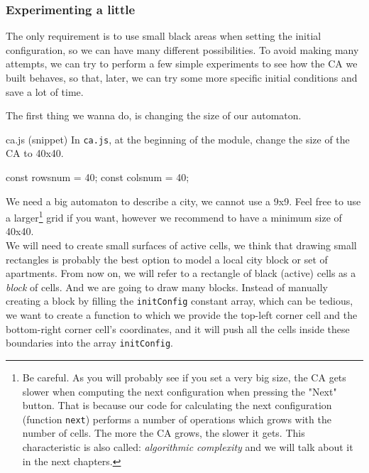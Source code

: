 \subsubsection{Experimenting a little}
The only requirement is to use small black areas when setting the initial configuration, so
we can have many different possibilities. To avoid making many attempts, we can try to perform
a few simple experiments to see how the CA we built behaves, so that, later, we can try some more
specific initial conditions and save a lot of time.

The first thing we wanna do, is changing the size of our automaton.

\begin{programcode}{ca.js (snippet)}
In \texttt{ca.js}, at the beginning of the module, change the size of the CA to 40x40.
\begin{code}
const rowsnum = 40;
const colsnum = 40;
\end{code}
\end{programcode}

We need a big automaton to describe a city, we cannot use a 9x9. Feel free to use a 
larger\footnote{Be careful. As you will probably see if you set a very big size, the CA gets slower when computing the next configuration when pressing the "Next" button. That is because our code for calculating the next configuration
(function \texttt{next}) performs a number of operations which grows with the number of cells.
The more the CA grows, the slower it gets. This characteristic is also called:
\textit{algorithmic complexity} and we will talk about it in the next chapters.} grid if
you want, however we recommend to have a minimum size of 40x40.\\

We will need to create small surfaces of active cells, we think that drawing small rectangles
is probably the best option to model a local city block or set of apartments. 
From now on, we will refer to a rectangle of black (active) cells as a \textit{block} of cells.
And we are going to draw many blocks. Instead of manually creating a block by filling the
\texttt{initConfig} constant array, which can be tedious, we want to create a function
to which we provide the top-left corner cell and the bottom-right corner cell's coordinates, and it
will push all the cells inside these boundaries into the array \texttt{initConfig}.

